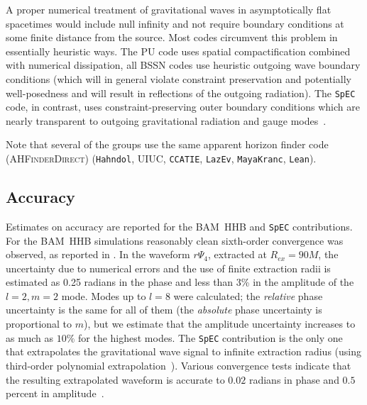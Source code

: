 A proper numerical treatment of gravitational waves in asymptotically
flat spacetimes would include null infinity and not require boundary
conditions at some finite distance from the source.  Most codes
circumvent this problem in essentially heuristic ways. The PU code
uses spatial compactification combined with numerical dissipation, all
BSSN codes use heuristic outgoing wave boundary conditions (which will
in general violate constraint preservation and potentially
well-posedness and will result in reflections of the outgoing
radiation).  The {\tt SpEC} code, in contrast, uses
constraint-preserving outer boundary conditions which are nearly
transparent to outgoing gravitational radiation and gauge
modes~\cite{Rinne:2007ui}. 

Note that several of the groups use the same apparent horizon finder 
code (\textsc{AHFinderDirect})
\cite{Thornburg:1995cp,Thornburg:2003sf}
({\tt Hahndol}, UIUC, {\tt CCATIE}, {\tt LazEv}, {\tt MayaKranc}, {\tt Lean}). 


\subsection{Accuracy}
\label{ssec:accuracy}


Estimates on accuracy are reported for the BAM~HHB and {\tt SpEC}
contributions.  For the BAM~HHB simulations reasonably clean
sixth-order convergence was observed, as reported in
\cite{Hannam:2007ik,Hannam:2007wf}. In the waveform $r\Psi_4$,
extracted at $R_{ex} = 90M$, the uncertainty due to numerical errors
and the use of finite extraction radii is estimated as 0.25 radians in
the phase and less than 3\% in the amplitude of the $l=2,m=2$ mode.
Modes up to $l = 8$ were calculated; the {\it relative} phase
uncertainty is the same for all of them (the {\it absolute} phase
uncertainty is proportional to $m$), but we estimate that the
amplitude uncertainty increases to as much as $10\%$ for the highest
modes. 
%
The {\tt SpEC} contribution is the only one that extrapolates the
gravitational wave signal to infinite extraction radius (using
third-order polynomial extrapolation~\cite{Boyle:2007ft}). Various
convergence tests indicate that the resulting extrapolated waveform is
accurate to $0.02$ radians in phase and $0.5$ percent in
amplitude~\cite{Boyle:2007ft}.
%

